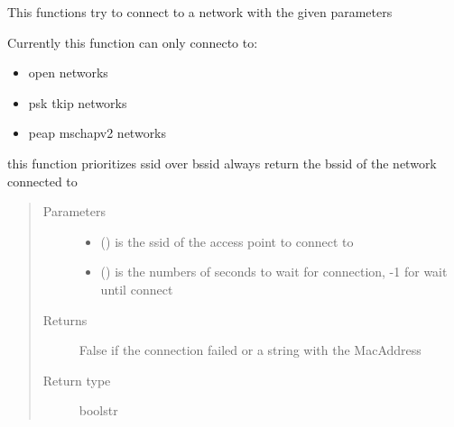 \documentclass[letterpaper,10pt,english]{sphinxhowto}
\begin{document}

\begin{fulllineitems}
\label{\detokenize{index:nm_dbus_python.connecttoAP}}
This functions try to connect to a network with the given parameters

Currently this function can only connecto to:
\begin{itemize}
\item {} 
open networks

\item {} 
psk tkip networks

\item {} 
peap mschapv2 networks

\end{itemize}

this function prioritizes ssid over bssid
always return the bssid of the network connected to
\begin{quote}\begin{description}
\item[{Parameters}] \leavevmode\begin{itemize}
\item {} 
 () \textendash{} is the ssid of the access point to connect to

\item {} 
 () \textendash{} is the numbers of seconds to wait for connection, -1 for wait until connect

\end{itemize}

\item[{Returns}] \leavevmode
False if the connection failed or a string with the MacAddress

\item[{Return type}] \leavevmode
bool\textbar{}str

\end{description}\end{quote}

\end{fulllineitems}
\end{document}
